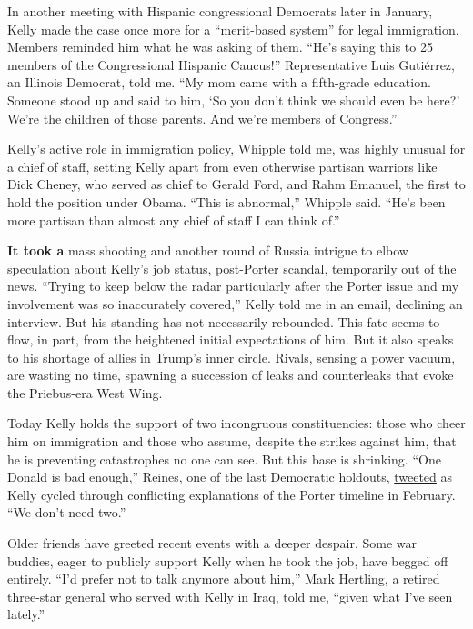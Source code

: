 In another meeting with Hispanic congressional Democrats later in
January, Kelly made the case once more for a ``merit-based system'' for
legal immigration. Members reminded him what he was asking of them.
``He's saying this to 25 members of the Congressional Hispanic Caucus!''
Representative Luis Gutiérrez, an Illinois Democrat, told me. ``My mom
came with a fifth-grade education. Someone stood up and said to him, `So
you don't think we should even be here?' We're the children of those
parents. And we're members of Congress.''

Kelly's active role in immigration policy, Whipple told me, was highly
unusual for a chief of staff, setting Kelly apart from even otherwise
partisan warriors like Dick Cheney, who served as chief to Gerald Ford,
and Rahm Emanuel, the first to hold the position under Obama. ``This is
abnormal,'' Whipple said. ``He's been more partisan than almost any
chief of staff I can think of.''

\textbf{It took a} mass shooting and another round of Russia intrigue to
elbow speculation about Kelly's job status, post-Porter scandal,
temporarily out of the news. ``Trying to keep below the radar
particularly after the Porter issue and my involvement was so
inaccurately covered,'' Kelly told me in an email, declining an
interview. But his standing has not necessarily rebounded. This fate
seems to flow, in part, from the heightened initial expectations of him.
But it also speaks to his shortage of allies in Trump's inner circle.
Rivals, sensing a power vacuum, are wasting no time, spawning a
succession of leaks and counterleaks that evoke the Priebus-era West
Wing.

Today Kelly holds the support of two incongruous constituencies: those
who cheer him on immigration and those who assume, despite the strikes
against him, that he is preventing catastrophes no one can see. But this
base is shrinking. ``One Donald is bad enough,'' Reines, one of the last
Democratic holdouts,
\href{https://twitter.com/PhilippeReines/status/961585598871064576}{tweeted}
as Kelly cycled through conflicting explanations of the Porter timeline
in February. ``We don't need two.''

Older friends have greeted recent events with a deeper despair. Some war
buddies, eager to publicly support Kelly when he took the job, have
begged off entirely. ``I'd prefer not to talk anymore about him,'' Mark
Hertling, a retired three-star general who served with Kelly in Iraq,
told me, ``given what I've seen lately.''

